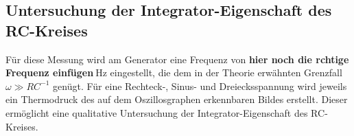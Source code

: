 \subsection{Untersuchung der Integrator-Eigenschaft des RC-Kreises}
Für diese Messung wird am Generator eine Frequenz von \textbf{hier noch die rchtige Frequenz einfügen}$\SI{}{\hertz}$ eingestellt, die dem in der Theorie erwähnten Grenzfall $\omega \gg RC^{-1}$ genügt. %
Für eine Rechteck-, Sinus- und Dreiecksspannung wird
jeweils ein Thermodruck des auf dem Oszillosgraphen erkennbaren Bildes erstellt. Dieser ermöglicht eine qualitative Untersuchung der %
Integrator-Eigenschaft des RC-Kreises. %
